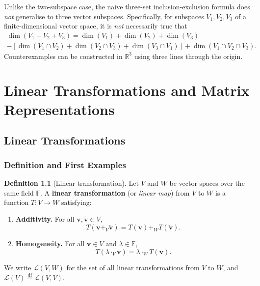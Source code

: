 \documentclass[11pt, a4paper, notitlepage]{report}
\theoremstyle{definition}
\newtheorem{definition}[theorem]{Definition}
\theoremstyle{remark}
\begin{document}
\begin{warning}[title={Warning: Inclusion-Exclusion for Three Subspaces}]
Unlike the two-subspace case, the naive three-set inclusion-exclusion formula does \emph{not} generalise to three vector subspaces. Specifically, for subspaces $V_1, V_2, V_3$ of a finite-dimensional vector space, it is \emph{not} necessarily true that
\begin{multline}
  \dim(V_1+V_2+V_3) = \dim(V_1)+\dim(V_2)+\dim(V_3) \\
  - [\dim(V_1\cap V_2)+\dim(V_2\cap V_3)+\dim(V_3\cap V_1)] + \dim(V_1\cap V_2\cap V_3).
\end{multline}
Counterexamples can be constructed in $\mathbb{R}^3$ using three lines through the origin.
\end{warning}

\chapter{Linear Transformations and Matrix Representations}
\label{chap:week5}

\section{Linear Transformations}
\label{sec:linear-transformations}

\subsection{Definition and First Examples}

\begin{definition}[Linear transformation]\label{def:lin-trans}
Let $V$ and $W$ be vector spaces over the same field $\mathbb{F}$.
A \textbf{linear transformation} (or \emph{linear map}) from $V$ to $W$ is a function
$T : V \to W$ satisfying:
\begin{enumerate}
  \item \textbf{Additivity.} For all $\mathbf{v}, \tilde{\mathbf{v}} \in V$,
        \[
          T(\mathbf{v} +_V \tilde{\mathbf{v}}) = T(\mathbf{v}) +_W T(\tilde{\mathbf{v}}).
        \]
  \item \textbf{Homogeneity.} For all $\mathbf{v} \in V$ and $\lambda \in \mathbb{F}$,
        \[
          T(\lambda \cdot_V \mathbf{v}) = \lambda \cdot_W T(\mathbf{v}).
        \]
\end{enumerate}
We write $\mathcal{L}(V, W)$ for the set of all linear transformations from $V$ to $W$,
and $\mathcal{L}(V) \stackrel{\mathrm{df}}{=} \mathcal{L}(V, V)$.
\end{definition}
\end{document}
